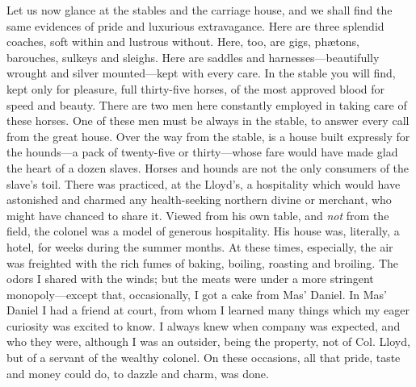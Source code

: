 Let us now glance at the stables and the carriage house, and we shall
find the same evidences of pride and luxurious extravagance. Here are
three splendid coaches, soft within and lustrous without. Here, too, are
gigs, phætons, barouches, sulkeys and sleighs. Here are saddles and
harnesses---beautifully wrought and silver mounted---kept with every
care. In the stable you will find, kept only for pleasure, full
thirty-five horses, of the most approved blood for speed and beauty.
There are two men here constantly employed in taking care of these
horses. One of these men must be always in the stable, to answer every
call from the great house. Over the way from the stable, is a house
built expressly for the hounds---a pack of twenty-five or thirty---whose
fare would have made glad the heart of a dozen slaves. Horses and hounds
are not the only consumers of the slave's toil. There was practiced, at
the Lloyd's, a hospitality which would have astonished and charmed any
health-seeking northern divine or merchant, who might have chanced to
share it. Viewed from his own table, and \emph{not} from the field, the
colonel was a model of generous hospitality. His house was, literally, a
hotel, for weeks during the summer months. At these times, especially,
the air was freighted with the rich fumes of baking, boiling, roasting
and broiling. The odors I shared with the winds; but the meats were
under a more stringent monopoly---except that, occasionally, I got a
cake from Mas' Daniel. In Mas' Daniel I had a friend at court, from whom
I learned many things {\protect\hypertarget{111}{}{}}which my eager
curiosity was excited to know. I always knew when company was expected,
and who they were, although I was an outsider, being the property, not
of Col. Lloyd, but of a servant of the wealthy colonel. On these
occasions, all that pride, taste and money could do, to dazzle and
charm, was done.

